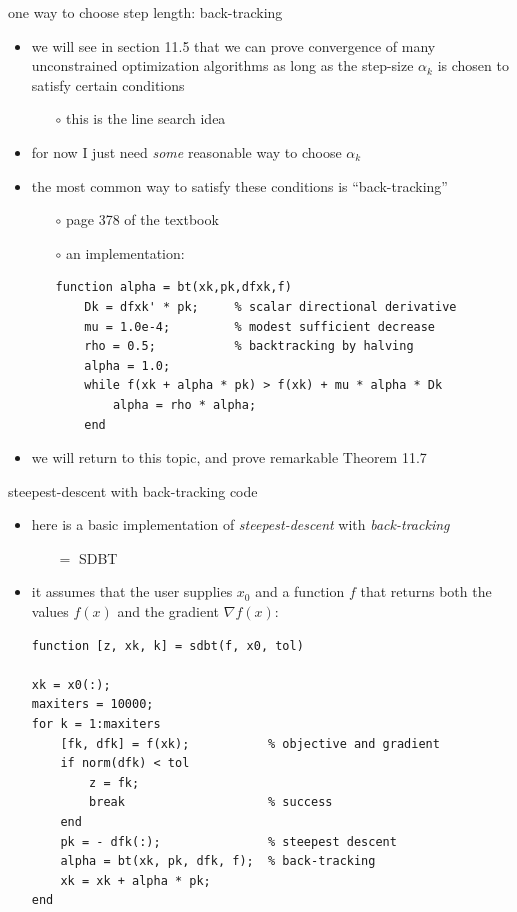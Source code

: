 \documentclass[10pt,hyperref]{beamer}
\newcommand{\grad}{\nabla}
\begin{document}
\begin{frame}[fragile]{one way to choose step length: back-tracking}

\begin{itemize}
\item we will see in section 11.5 that we can prove convergence of many unconstrained optimization algorithms as long as the step-size $\alpha_k$ is chosen to satisfy certain conditions
    \begin{itemize}
    \item[$\circ$] this is the \alert{line search} idea
    \end{itemize}
\item for now I just need \emph{some} reasonable way to choose $\alpha_k$
\item the most common way to satisfy these conditions is ``back-tracking''
    \begin{itemize}
    \item[$\circ$] page 378 of the textbook
    \item[$\circ$] an implementation:

\medskip
\begin{Verbatim}[fontsize=\footnotesize]
    function alpha = bt(xk,pk,dfxk,f)
    Dk = dfxk' * pk;     % scalar directional derivative
    mu = 1.0e-4;         % modest sufficient decrease
    rho = 0.5;           % backtracking by halving
    alpha = 1.0;
    while f(xk + alpha * pk) > f(xk) + mu * alpha * Dk
        alpha = rho * alpha;
    end
\end{Verbatim}
    \end{itemize}

\medskip
\item \alert{we will return to this topic}, and prove remarkable Theorem 11.7
\end{itemize}
\end{frame}


\begin{frame}[fragile]{steepest-descent with back-tracking code}

\begin{itemize}
\item here is a basic implementation of \emph{steepest-descent} with \emph{back-tracking}
    \begin{itemize}
    \item[$=$] SDBT
    \end{itemize}
\item it assumes that the user supplies $x_0$ and a function $f$ that returns both the values $f(x)$ and the gradient $\grad f(x)$:

\medskip
\begin{Verbatim}[fontsize=\small]
function [z, xk, k] = sdbt(f, x0, tol)

xk = x0(:);
maxiters = 10000;
for k = 1:maxiters
    [fk, dfk] = f(xk);           % objective and gradient
    if norm(dfk) < tol
        z = fk;
        break                    % success
    end
    pk = - dfk(:);               % steepest descent
    alpha = bt(xk, pk, dfk, f);  % back-tracking
    xk = xk + alpha * pk;
end
\end{Verbatim}
\end{itemize}
\end{frame}
\end{document}
